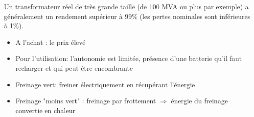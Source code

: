 \begin{questions}
\begin{solution}
Un transformateur réel de très grande taille (de 100 MVA ou plus par exemple) a généralement un rendement supérieur à 99\% (les pertes nominales sont inférieures à 1\%).
\end{solution}

\begin{solution}
\begin{itemize}
\item A l'achat : le prix élevé
\item Pour l'utilisation:  l'autonomie est limitée,  présence d'une batterie qu'il faut recharger et qui peut être encombrante
\end{itemize}

\begin{itemize}
\item Freinage vert:  freiner électriquement en récupérant l'énergie
\item Freinage "moins vert" : freinage par frottement  $\Rightarrow$ énergie du freinage convertie en chaleur
\end{itemize}

\end{solution}


\end{questions}
